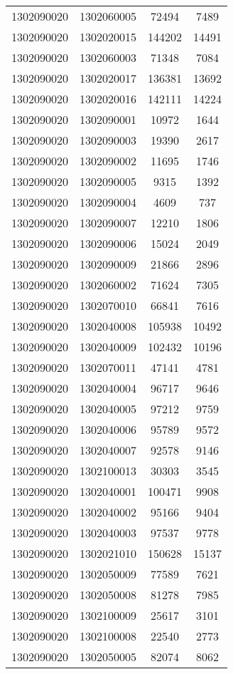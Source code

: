 \begin{longtable}{llcc}
1302090020 & 1302060005 & 72494 & 7489\\
1302090020 & 1302020015 & 144202 & 14491\\
1302090020 & 1302060003 & 71348 & 7084\\
1302090020 & 1302020017 & 136381 & 13692\\
1302090020 & 1302020016 & 142111 & 14224\\
1302090020 & 1302090001 & 10972 & 1644\\
1302090020 & 1302090003 & 19390 & 2617\\
1302090020 & 1302090002 & 11695 & 1746\\
1302090020 & 1302090005 & 9315 & 1392\\
1302090020 & 1302090004 & 4609 & 737\\
1302090020 & 1302090007 & 12210 & 1806\\
1302090020 & 1302090006 & 15024 & 2049\\
1302090020 & 1302090009 & 21866 & 2896\\
1302090020 & 1302060002 & 71624 & 7305\\
1302090020 & 1302070010 & 66841 & 7616\\
1302090020 & 1302040008 & 105938 & 10492\\
1302090020 & 1302040009 & 102432 & 10196\\
1302090020 & 1302070011 & 47141 & 4781\\
1302090020 & 1302040004 & 96717 & 9646\\
1302090020 & 1302040005 & 97212 & 9759\\
1302090020 & 1302040006 & 95789 & 9572\\
1302090020 & 1302040007 & 92578 & 9146\\
1302090020 & 1302100013 & 30303 & 3545\\
1302090020 & 1302040001 & 100471 & 9908\\
1302090020 & 1302040002 & 95166 & 9404\\
1302090020 & 1302040003 & 97537 & 9778\\
1302090020 & 1302021010 & 150628 & 15137\\
1302090020 & 1302050009 & 77589 & 7621\\
1302090020 & 1302050008 & 81278 & 7985\\
1302090020 & 1302100009 & 25617 & 3101\\
1302090020 & 1302100008 & 22540 & 2773\\
1302090020 & 1302050005 & 82074 & 8062\\

\end{longtable}

